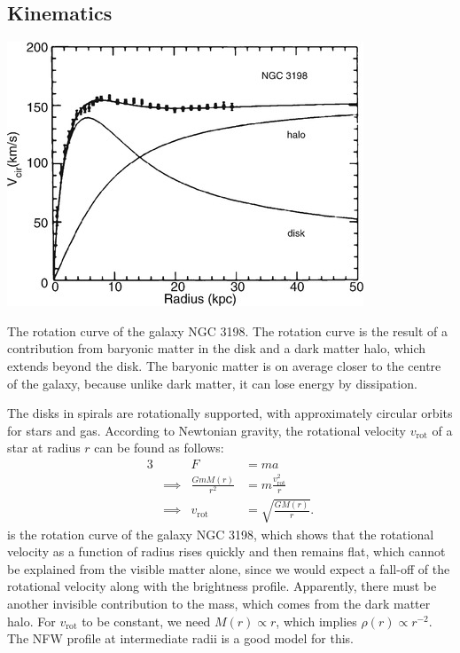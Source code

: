 \subsection{Kinematics}
\begin{marginfigure}
	\includegraphics[width=\textwidth]{img/ch-05/rotation-curve.png}
	\caption{The rotation curve of the galaxy NGC 3198. The rotation curve is the result of a contribution from baryonic matter in the disk and a dark matter halo, which extends beyond the disk. The baryonic matter is on average closer to the centre of the galaxy, because unlike dark matter, it can lose energy by dissipation.}
	\label{fig:rotation-curve}
\end{marginfigure}
The disks in spirals are rotationally supported, with approximately circular orbits for stars and gas.
According to Newtonian gravity, the rotational velocity $v_\text{rot}$ of a star at radius $r$ can be found as follows:
\begin{alignat*}{3}
	         && F &= ma\\
	&\implies & \frac{G m M(r)}{r^2} &= m \frac{v_\text{rot}^2}{r}\\
	&\implies & v_\text{rot} &= \sqrt{\frac{G M(r)}{r}}.
\end{alignat*}
 is the rotation curve of the galaxy NGC 3198, which shows that the rotational velocity as a function of radius rises quickly and then remains flat, which cannot be explained from the visible matter alone, since we would expect a fall-off of the rotational velocity along with the brightness profile.
Apparently, there must be another invisible contribution to the mass, which comes from the dark matter halo.
For $v_\text{rot}$ to be constant, we need $M(r) \propto r$, which implies $\rho(r) \propto r^{-2}$.
The NFW profile at intermediate radii is a good model for this.

